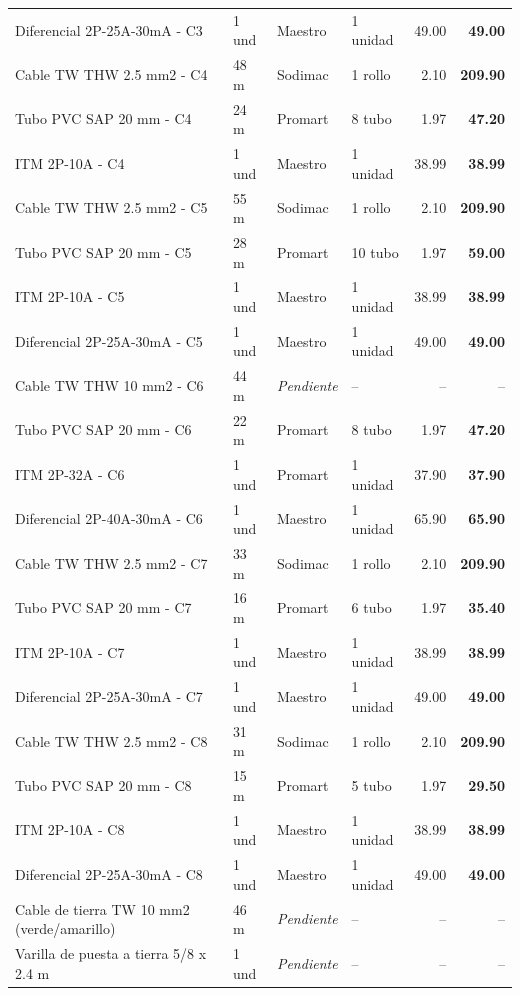 \begin{longtable}{p{5.0cm} p{1.5cm} p{2.2cm} p{2.2cm} r r}
Diferencial 2P-25A-30mA - C3 & 1 und & Maestro & 1 unidad & 49.00 & \textbf{49.00} \\
Cable TW THW 2.5 mm2 - C4 & 48 m & Sodimac & 1 rollo & 2.10 & \textbf{209.90} \\
Tubo PVC SAP 20 mm - C4 & 24 m & Promart & 8 tubo & 1.97 & \textbf{47.20} \\
ITM 2P-10A - C4 & 1 und & Maestro & 1 unidad & 38.99 & \textbf{38.99} \\
Cable TW THW 2.5 mm2 - C5 & 55 m & Sodimac & 1 rollo & 2.10 & \textbf{209.90} \\
Tubo PVC SAP 20 mm - C5 & 28 m & Promart & 10 tubo & 1.97 & \textbf{59.00} \\
ITM 2P-10A - C5 & 1 und & Maestro & 1 unidad & 38.99 & \textbf{38.99} \\
Diferencial 2P-25A-30mA - C5 & 1 und & Maestro & 1 unidad & 49.00 & \textbf{49.00} \\
Cable TW THW 10 mm2 - C6 & 44 m & \textit{Pendiente} & -- & -- & -- \\
Tubo PVC SAP 20 mm - C6 & 22 m & Promart & 8 tubo & 1.97 & \textbf{47.20} \\
ITM 2P-32A - C6 & 1 und & Promart & 1 unidad & 37.90 & \textbf{37.90} \\
Diferencial 2P-40A-30mA - C6 & 1 und & Maestro & 1 unidad & 65.90 & \textbf{65.90} \\
Cable TW THW 2.5 mm2 - C7 & 33 m & Sodimac & 1 rollo & 2.10 & \textbf{209.90} \\
Tubo PVC SAP 20 mm - C7 & 16 m & Promart & 6 tubo & 1.97 & \textbf{35.40} \\
ITM 2P-10A - C7 & 1 und & Maestro & 1 unidad & 38.99 & \textbf{38.99} \\
Diferencial 2P-25A-30mA - C7 & 1 und & Maestro & 1 unidad & 49.00 & \textbf{49.00} \\
Cable TW THW 2.5 mm2 - C8 & 31 m & Sodimac & 1 rollo & 2.10 & \textbf{209.90} \\
Tubo PVC SAP 20 mm - C8 & 15 m & Promart & 5 tubo & 1.97 & \textbf{29.50} \\
ITM 2P-10A - C8 & 1 und & Maestro & 1 unidad & 38.99 & \textbf{38.99} \\
Diferencial 2P-25A-30mA - C8 & 1 und & Maestro & 1 unidad & 49.00 & \textbf{49.00} \\
Cable de tierra TW 10 mm2 (verde/amarillo) & 46 m & \textit{Pendiente} & -- & -- & -- \\
Varilla de puesta a tierra 5/8 x 2.4 m & 1 und & \textit{Pendiente} & -- & -- & -- \\

\end{longtable}
